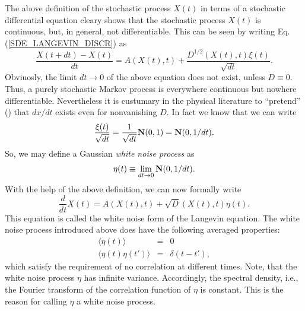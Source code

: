 The above definition of the stochastic process $X(t)$
in terms of a stochastic differential equation  cleary shows that
the stochastic process $X(t)$ is continuous, but, in general, not 
differentiable. This can be seen by writing
Eq. (\ref{SDE_LANGEVIN_DISCR}) as
\begin{equation*}
\frac{X(t+dt) - X(t)}{dt} = A(X(t),t) + \frac{D^{1/2}(X(t),t) \xi(t)}
                                              {\sqrt{dt}}.
\end{equation*}
Obviuosly, the limit $dt \rightarrow 0$ of the above equation does not
exist, unless $D\equiv 0$. Thus, a purely stochastic Markov process
is everywhere continuous but nowhere differentiable. Nevertheless it is
custumary in the physical literature to ``pretend'' (\cite{GILLESPIE})
that $dx/dt$ exists even for
nonvanishing $D$. In fact we know that we can write
\begin{equation*}
\frac{\xi(t)}{\sqrt{dt}} = \frac{1}{\sqrt{dt}} {\bf N}(0,1) =
{\bf N}(0,1/dt).
\end{equation*}
So, we may define a Gaussian {\em white noise process} as
\begin{equation*}
\eta(t) \equiv \lim_{dt \rightarrow 0}  {\bf N}(0,1/dt).
\end{equation*}
With the help of the above definition, we can now formally write
\begin{equation*}
\frac{d}{dt} X(t) = A(X(t),t) + \sqrt{D}(X(t),t) \eta(t).
\end{equation*}
This equation is called the white noise form of the Langevin equation.
The white noise process introduced above does have the following
averaged properties:
\begin{eqnarray*}
\langle \eta(t) \rangle &=& 0 \\
\langle \eta(t) \eta(t') \rangle &=& \delta(t-t'),
\end{eqnarray*}
which satisfy the requirement of no correlation at different
times. Note, that the white noise process  $\eta$ has
infinite variance. Accordingly, the spectral density, i.e.,
the Fourier transform of the correlation function of $\eta$ is 
constant. This is the reason for calling $\eta$ a white noise
process.

